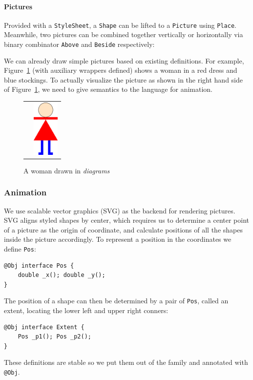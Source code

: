 \paragraph{Pictures}
Provided with a \texttt{StyleSheet}, a \texttt{Shape} can be lifted to a
\texttt{Picture} using \texttt{Place}. Meanwhile, two pictures can be
combined together vertically or horizontally via binary combinator
\texttt{Above} and \texttt{Beside} respectively:


We can already draw simple pictures based on existing definitions.
For example, Figure~\ref{woman} (with auxiliary wrappers defined) shows
a woman in a red dress and blue stockings.
To actually visualize the picture as shown in the right hand side of
Figure~\ref{woman}, we need to give semantics to the language for animation.

\begin{figure}
  \begin{tabular}{lr}
\begin{minipage}[t]{.9\textwidth}
\end{minipage}
&
\begin{minipage}[t]{.1\textwidth}
  \vspace{0.2em}
\includegraphics[width=1.3cm]{woman.png}
\end{minipage} \\
\end{tabular}
\caption{A woman drawn in \emph{diagrams}}
\label{woman}
\end{figure}

\subsubsection{Animation}
We use scalable vector graphics (SVG) as the backend for rendering
pictures.
SVG aligns styled shapes by center, which requires us to determine a center
point of a picture as the origin of coordinate, and calculate
positions of all the shapes inside the picture accordingly.
To represent a position in the coordinates we define \texttt{Pos}:
\begin{lstlisting}
@Obj interface Pos {
    double _x(); double _y();
}
\end{lstlisting}
The position of a shape can then be determined by a pair of \texttt{Pos}, called
an extent,
locating the lower left and upper right conners:
\begin{lstlisting}
@Obj interface Extent {
    Pos _p1(); Pos _p2();
}
\end{lstlisting}
These definitions are stable so we put them out of the family and annotated
with \texttt{@Obj}.


